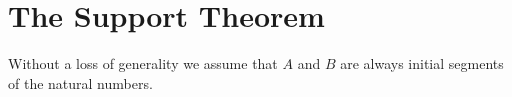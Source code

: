 \documentclass[12pt]{report}
\begin{document}
\section{The Support Theorem}

Without a loss of generality we assume that $A$ and $B$ are always initial
segments of the natural numbers.


\end{document}

